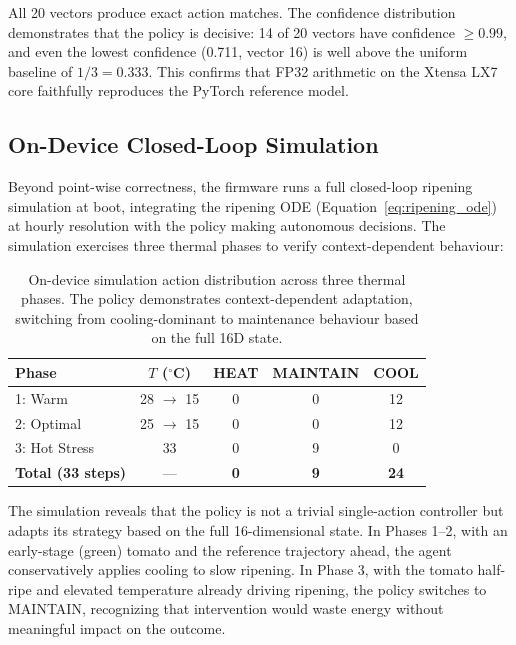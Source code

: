     All 20 vectors produce exact action matches. The confidence distribution demonstrates that the policy is decisive: 14 of 20 vectors have confidence $\geq 0.99$, and even the lowest confidence (0.711, vector 16) is well above the uniform baseline of $1/3 = 0.333$. This confirms that FP32 arithmetic on the Xtensa LX7 core faithfully reproduces the PyTorch reference model.

    \subsection{On-Device Closed-Loop Simulation}

    Beyond point-wise correctness, the firmware runs a full closed-loop ripening simulation at boot, integrating the ripening ODE (Equation~\ref{eq:ripening_ode}) at hourly resolution with the policy making autonomous decisions. The simulation exercises three thermal phases to verify context-dependent behaviour:

    \begin{table}[ht]
        \caption{On-device simulation action distribution across three thermal phases. The policy demonstrates context-dependent adaptation, switching from cooling-dominant to maintenance behaviour based on the full 16D state.}
        \label{tab:sim_actions}
        \centering
        \begin{tabular}{lcccc}
            \hline
            \textbf{Phase} & \textbf{$T$ ($^{\circ}$C)} & \textbf{HEAT} & \textbf{MAINTAIN} & \textbf{COOL} \\
            \hline
            1: Warm & 28 $\to$ 15 & 0 & 0 & 12 \\
            2: Optimal & 25 $\to$ 15 & 0 & 0 & 12 \\
            3: Hot Stress & 33 & 0 & 9 & 0 \\
            \hline
            \textbf{Total (33 steps)} & --- & \textbf{0} & \textbf{9} & \textbf{24} \\
            \hline
        \end{tabular}
    \end{table}

    The simulation reveals that the policy is not a trivial single-action controller but adapts its strategy based on the full 16-dimensional state. In Phases 1--2, with an early-stage (green) tomato and the reference trajectory ahead, the agent conservatively applies cooling to slow ripening. In Phase 3, with the tomato half-ripe and elevated temperature already driving ripening, the policy switches to MAINTAIN, recognizing that intervention would waste energy without meaningful impact on the outcome.

